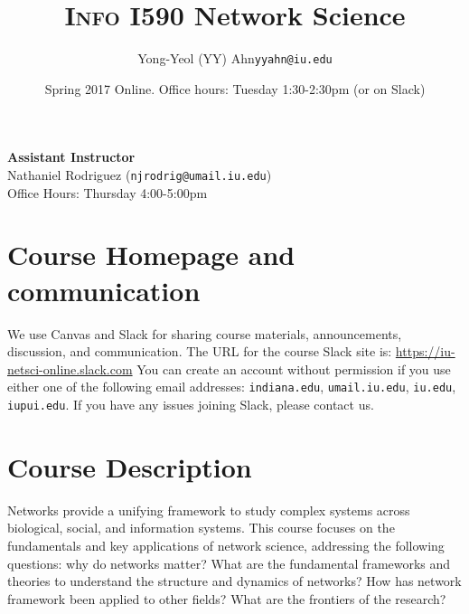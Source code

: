 \documentclass[11pt,article,oneside]{memoir}
\makeatletter
\def\myauthor{Author}
\def\mytitle{Title}
\def\myemail{yyahn@iu.edu}
\def\myauthor{Yong-Yeol (YY) Ahn}
\def\mytitle{{\normalsize \textsc{Info} I590 \newline} \HUGE Network Science}
\makeatother
\begin{document}

\def\ind{\hangindent=1 true cm\hangafter=1 \noindent}
\def\labelitemi{$\cdot$}


\title{\LARGE \mytitle}     
\author{\Large\myauthor \newline \footnotesize\texttt{\noindent\myemail}}
\date{Spring 2017 Online. %
\newline Office hours: Tuesday 1:30-2:30pm (or on Slack)}

\maketitle

\vspace{-20pt}
{\bfseries Assistant Instructor} \\ Nathaniel Rodriguez (\texttt{njrodrig@umail.iu.edu}) \\ Office Hours: Thursday 4:00-5:00pm

\section{Course Homepage and communication}

We use Canvas and Slack for sharing course materials, announcements,
discussion, and communication. The URL for the course Slack site is:
\url{https://iu-netsci-online.slack.com} You can create an account without
permission if you use either one of the following email addresses:
\texttt{indiana.edu}, \texttt{umail.iu.edu}, \texttt{iu.edu},
\texttt{iupui.edu}. If you have any issues joining Slack, please contact us. 


\section{Course Description}

Networks provide a unifying framework to study complex systems across
biological, social, and information systems. This course focuses on the
fundamentals and key applications of network science, addressing the following
questions: why do networks matter? What are the fundamental frameworks and
theories to understand the structure and dynamics of networks?  How has network
framework been applied to other fields? What are the frontiers of the research?
\end{document}
